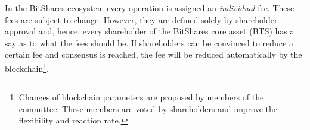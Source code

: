 \label{sec:dexfee}

In the BitShares ecosystem every operation is assigned an \emph{individual}
fee. These fees are subject to change. However, they are defined solely by
shareholder approval and, hence, every shareholder of the BitShares core asset
(BTS) has a say as to what the fees should be. If shareholders can be convinced
to reduce a certain fee and consensus is reached, the fee will be reduced
automatically by the blockchain\footnote{Changes of blockchain parameters are
proposed by members of the committee. These members are voted by shareholders
and improve the flexibility and reaction rate.}.

